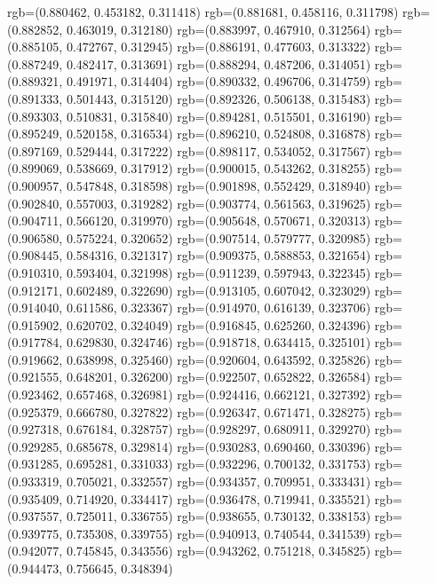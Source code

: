{{{					rgb=(0.880462, 0.453182, 0.311418)
					rgb=(0.881681, 0.458116, 0.311798)
					rgb=(0.882852, 0.463019, 0.312180)
					rgb=(0.883997, 0.467910, 0.312564)
					rgb=(0.885105, 0.472767, 0.312945)
					rgb=(0.886191, 0.477603, 0.313322)
					rgb=(0.887249, 0.482417, 0.313691)
					rgb=(0.888294, 0.487206, 0.314051)
					rgb=(0.889321, 0.491971, 0.314404)
					rgb=(0.890332, 0.496706, 0.314759)
					rgb=(0.891333, 0.501443, 0.315120)
					rgb=(0.892326, 0.506138, 0.315483)
					rgb=(0.893303, 0.510831, 0.315840)
					rgb=(0.894281, 0.515501, 0.316190)
					rgb=(0.895249, 0.520158, 0.316534)
					rgb=(0.896210, 0.524808, 0.316878)
					rgb=(0.897169, 0.529444, 0.317222)
					rgb=(0.898117, 0.534052, 0.317567)
					rgb=(0.899069, 0.538669, 0.317912)
					rgb=(0.900015, 0.543262, 0.318255)
					rgb=(0.900957, 0.547848, 0.318598)
					rgb=(0.901898, 0.552429, 0.318940)
					rgb=(0.902840, 0.557003, 0.319282)
					rgb=(0.903774, 0.561563, 0.319625)
					rgb=(0.904711, 0.566120, 0.319970)
					rgb=(0.905648, 0.570671, 0.320313)
					rgb=(0.906580, 0.575224, 0.320652)
					rgb=(0.907514, 0.579777, 0.320985)
					rgb=(0.908445, 0.584316, 0.321317)
					rgb=(0.909375, 0.588853, 0.321654)
					rgb=(0.910310, 0.593404, 0.321998)
					rgb=(0.911239, 0.597943, 0.322345)
					rgb=(0.912171, 0.602489, 0.322690)
					rgb=(0.913105, 0.607042, 0.323029)
					rgb=(0.914040, 0.611586, 0.323367)
					rgb=(0.914970, 0.616139, 0.323706)
					rgb=(0.915902, 0.620702, 0.324049)
					rgb=(0.916845, 0.625260, 0.324396)
					rgb=(0.917784, 0.629830, 0.324746)
					rgb=(0.918718, 0.634415, 0.325101)
					rgb=(0.919662, 0.638998, 0.325460)
					rgb=(0.920604, 0.643592, 0.325826)
					rgb=(0.921555, 0.648201, 0.326200)
					rgb=(0.922507, 0.652822, 0.326584)
					rgb=(0.923462, 0.657468, 0.326981)
					rgb=(0.924416, 0.662121, 0.327392)
					rgb=(0.925379, 0.666780, 0.327822)
					rgb=(0.926347, 0.671471, 0.328275)
					rgb=(0.927318, 0.676184, 0.328757)
					rgb=(0.928297, 0.680911, 0.329270)
					rgb=(0.929285, 0.685678, 0.329814)
					rgb=(0.930283, 0.690460, 0.330396)
					rgb=(0.931285, 0.695281, 0.331033)
					rgb=(0.932296, 0.700132, 0.331753)
					rgb=(0.933319, 0.705021, 0.332557)
					rgb=(0.934357, 0.709951, 0.333431)
					rgb=(0.935409, 0.714920, 0.334417)
					rgb=(0.936478, 0.719941, 0.335521)
					rgb=(0.937557, 0.725011, 0.336755)
					rgb=(0.938655, 0.730132, 0.338153)
					rgb=(0.939775, 0.735308, 0.339755)
					rgb=(0.940913, 0.740544, 0.341539)
					rgb=(0.942077, 0.745845, 0.343556)
					rgb=(0.943262, 0.751218, 0.345825)
					rgb=(0.944473, 0.756645, 0.348394)
}}}
